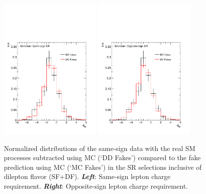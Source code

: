 \begin{figure}[!htb]
    \begin{center}
    \includegraphics[width=0.45\textwidth]{figures/search_hh/bkg_estimate/fake/fake_shape_NN_d_hh_sr_ss_out}
    \includegraphics[width=0.45\textwidth]{figures/search_hh/bkg_estimate/fake/fake_shape_NN_d_hh_sr_os_out}
    \caption{
        Normalized \dhh distributions of the same-sign data with the real SM processes subtracted using MC (`DD Fakes') compared
            to the fake prediction using MC (`MC Fakes') in the SR selections inclusive of dilepton flavor (SF+DF).
            \textit{\textbf{Left}}: Same-sign lepton charge requirement.
            \textit{\textbf{Right}}: Opposite-sign lepton charge requirement.
    }
    \label{fig:fake_val_ss_os_shape}
    \end{center}
\end{figure}

